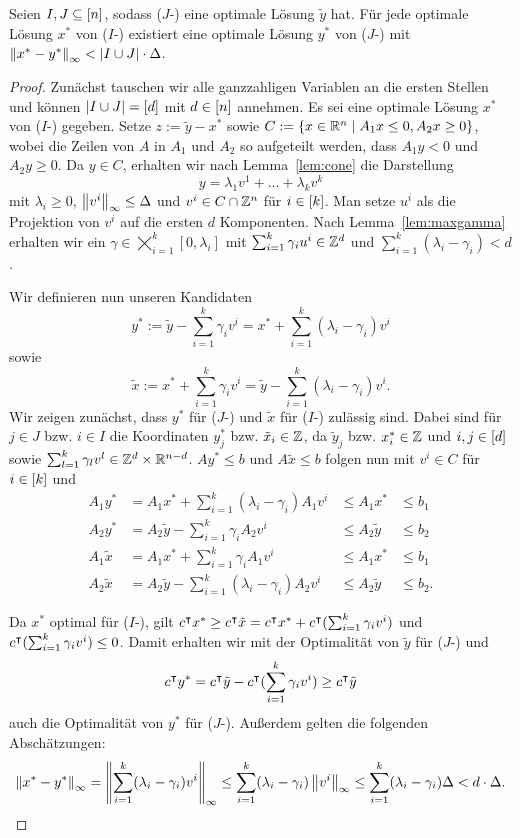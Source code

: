 \begin{theorem}\label{thm:theo2}
	Seien $I,J\subseteq[n]$, sodass ($J$-\MIPR) eine optimale Lösung $\tilde{y}$ hat.
	Für jede optimale Lösung $x^*$ von ($I$-\MIPR) existiert eine optimale Lösung $y^*$ von ($J$-\MIPR) mit $\left\lVert x^*-y^*\right\rVert_\infty<\lvert I\cup J \rvert\cdot\Delta$.
\end{theorem}
\begin{proof}
	Zunächst tauschen wir alle ganzzahligen Variablen an die ersten Stellen und können $\lvert I\cup J \rvert=[d]$ mit $d\in[n]$ annehmen.
	Es sei eine optimale Lösung $x^*$ von ($I$-\MIPR) gegeben.
	Setze $z:=\tilde{y}-x^*$ sowie $C:=\{ x\in\mathbb{R}^n \mid A_1 x \leq 0, A_2x\geq0 \}$, wobei die Zeilen von $A$ in $A_1$ und $A_2$ so aufgeteilt werden, dass $A_1y<0$ und $A_2y\geq0$.
	Da $y\in C$, erhalten wir nach Lemma~\ref{lem:cone} die Darstellung 
	$$y = \lambda_1v^1 + \dots+\lambda_kv^k$$
	mit $\lambda_i\geq0$, $\left\lVert v^i\right\rVert_\infty\leq \Delta$ und $v^i\in C\cap\mathbb{Z}^n$ für $i\in[k]$.
	Man setze $u^i$ als die Projektion von $v^i$ auf die ersten $d$ Komponenten.
	Nach Lemma~\ref{lem:maxgamma} erhalten wir ein $\gamma\in\bigtimes_{i=1}^k[0,\lambda_i]$ mit  $\sum_{i=1}^k\gamma_iu^i\in\mathbb{Z}^d$ und $\sum_{i=1}^k(\lambda_i -\gamma_i)<d$.
	
	Wir definieren nun unseren Kandidaten $$y^*:=\tilde{y}-\sum_{i=1}^k\gamma_iv^i=x^*+\sum_{i=1}^k(\lambda_i-\gamma_i)v^i$$
	sowie $$\tilde{x}:=x^*+\sum_{i=1}^k\gamma_iv^i=\tilde{y}-\sum_{i=1}^k(\lambda_i-\gamma_i)v^i.$$
	Wir zeigen zunächst, dass $y^*$ für ($J$-\MIPR) und $\tilde{x}$ für ($I$-\MIPR) zulässig sind.
	Dabei sind für $j\in J$ bzw. $i\in I$ die Koordinaten $y^*_j$ bzw. $\tilde{x}_i\in\mathbb{Z}$, da $\tilde{y}_j$ bzw. $x^*_i\in\mathbb{Z}$ und $i,j\in[d]$ sowie $\sum_{l=1}^k\gamma_lv^l\in\mathbb{Z}^d\times\mathbb{R}^{n-d}$.
	$Ay^*\leq b$ und $A\tilde{x}\leq b$ folgen nun mit $v^i\in C$ für $i\in[k]$ und 
	$$
	\begin{array}{llll}
	A_1 y^* &=A_1x^*+\sum_{i=1}^k(\lambda_i-\gamma_i)A_1v^i &\leq A_1 x^* &\leq b_1\\
	A_2 y^* &=A_2\tilde{y}-\sum_{i=1}^k\gamma_iA_2v^i &\leq A_2\tilde{y} &\leq b_2\\
	A_1\tilde{x} &=A_1x^*+\sum_{i=1}^k \gamma_iA_1v^i &\leq A_1x^* &\leq b_1\\
	A_2\tilde{x} &=A_2\tilde{y}-\sum_{i=1}^k(\lambda_i-\gamma_i)A_2v^i&\leq A_2\tilde{y}&\leq b_2.
	\end{array}
	$$
	
	Da $x^*$ optimal für ($I$-\MIPR), gilt $c^\intercal x^*\geq c^\intercal \tilde{x} = c^\intercal x^* + c^\intercal (\sum_{i=1}^k\gamma_iv^i)$ und  $c^\intercal(\sum_{i=1}^k\gamma_iv^i)\leq0$.
	Damit erhalten wir mit der Optimalität von $\tilde{y}$ für ($J$-\MIPR) und
	$$c^\intercal y^*=c^\intercal\tilde{y}-c^\intercal(\sum_{i=1}^k\gamma_iv^i)\geq c^\intercal\tilde{y}$$
	auch die Optimalität von $y^*$ für ($J$-\MIPR).
	Außerdem gelten die folgenden Abschätzungen:
	$$\left\lVert x^*-y^*\right\rVert_\infty=\left\lVert\sum_{i=1}^k(\lambda_i-\gamma_i)v^i\right\rVert_\infty\leq \sum_{i=1}^k(\lambda_i-\gamma_i)\left\lVert v^i\right\rVert_\infty\leq \sum_{i=1}^k(\lambda_i-\gamma_i)\Delta< d\cdot\Delta.
	$$
\end{proof}
